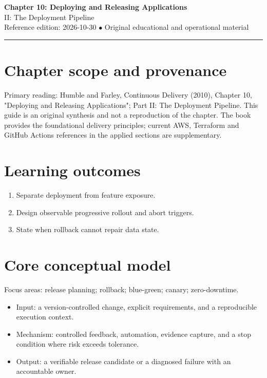 \documentclass[10pt,letterpaper]{article}
\begin{document}
\begin{center}
{\LARGE\bfseries\color{cdblue}Chapter 10: Deploying and Releasing Applications}\\[7pt]
{\large II: The Deployment Pipeline}\\[6pt]
{\small Reference edition: 2026-10-30 $\bullet$ Original educational and operational material}
\end{center}
\noindent\color{cdblue}\rule{\linewidth}{1.2pt}\color{black}
\vspace{0.4em}
\section{Chapter scope and provenance}
Primary reading: Humble and Farley, Continuous Delivery (2010), Chapter 10, "Deploying and Releasing Applications"; Part II: The Deployment Pipeline. This guide is an original synthesis and not a reproduction of the chapter. The book provides the foundational delivery principles; current AWS, Terraform and GitHub Actions references in the applied sections are supplementary.


\section{Learning outcomes}
\begin{enumerate}
\item Separate deployment from feature exposure.
\item Design observable progressive rollout and abort triggers.
\item State when rollback cannot repair data state.
\end{enumerate}

\section{Core conceptual model}
Focus areas: release planning; rollback; blue-green; canary; zero-downtime.

\begin{itemize}
\item Input: a version-controlled change, explicit requirements, and a reproducible execution context.
\item Mechanism: controlled feedback, automation, evidence capture, and a stop condition where risk exceeds tolerance.
\item Output: a verifiable release candidate or a diagnosed failure with an accountable owner.
\end{itemize}
\end{document}
